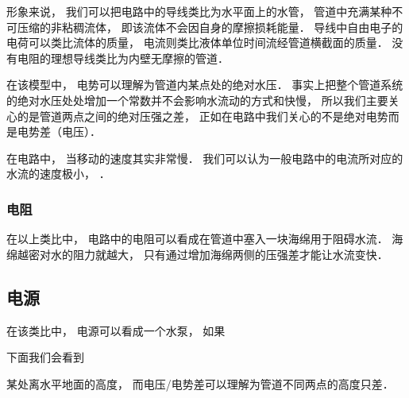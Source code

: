 


形象来说， 我们可以把电路中的导线类比为水平面上的水管， 管道中充满某种不可压缩的非粘稠流体， 即该流体不会因自身的摩擦损耗能量． 导线中自由电子的电荷可以类比流体的质量， 电流则类比液体单位时间流经管道横截面的质量． 没有电阻的理想导线类比为内壁无摩擦的管道．

在该模型中， 电势可以理解为管道内某点处的绝对水压． 事实上把整个管道系统的绝对水压处处增加一个常数并不会影响水流动的方式和快慢， 所以我们主要关心的是管道两点之间的绝对压强之差， 正如在电路中我们关心的不是绝对电势而是电势差（电压）．

在电路中， 当移动的速度其实非常慢． 我们可以认为一般电路中的电流所对应的水流的速度极小， ．

\subsubsection{电阻}
在以上类比中， 电路中的电阻可以看成在管道中塞入一块海绵用于阻碍水流． 海绵越密对水的阻力就越大， 只有通过增加海绵两侧的压强差才能让水流变快．

\subsection{电源}
在该类比中， 电源可以看成一个水泵， 如果




下面我们会看到

某处离水平地面的高度， 而电压/电势差可以理解为管道不同两点的高度只差．
